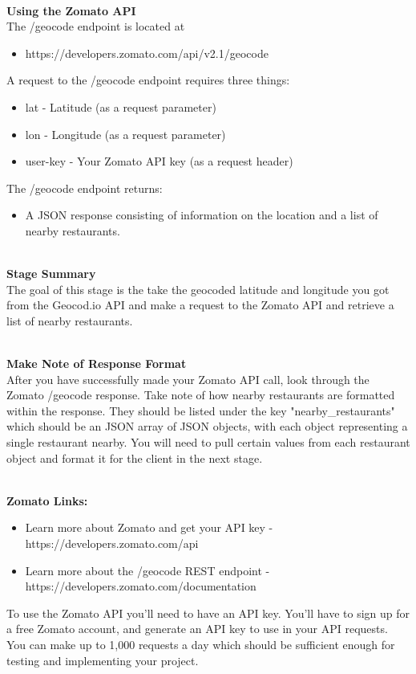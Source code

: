 \documentclass{article}
\newenvironment{info}[1][Info:]{ %
	\medskip
	\begin{mdframed}[style=info]
		\noindent{\textbf{#1}}
}{
	\end{mdframed}
}
\begin{document}
\-\ \\
\textbf{Using the Zomato API} \\
The /geocode endpoint is located at
\begin{itemize}
\item https://developers.zomato.com/api/v2.1/geocode
\end{itemize}
A request to the /geocode endpoint requires three things:
\begin{itemize}
\item lat - Latitude (as a request parameter)
\item lon - Longitude (as a request parameter)
\item user-key - Your Zomato API key (as a request header)
\end{itemize}
The /geocode endpoint returns:
\begin{itemize}
\item A JSON response consisting of information on the location and a list of nearby restaurants.
\end{itemize}

\-\ \\
\textbf{Stage Summary}\\
The goal of this stage is the take the geocoded latitude and longitude you got from the Geocod.io API and make a request to the Zomato API and retrieve a list of nearby restaurants.

\-\ \\
\textbf{Make Note of Response Format}\\
After you have successfully made your Zomato API call, look through the Zomato /geocode response. Take note of how nearby restaurants are formatted within the response. They should be listed under the key "nearby\_restaurants" which should be an JSON array of JSON objects, with each object representing a single restaurant nearby. You will need to pull certain values from each restaurant object and format it for the client in the next stage. 

\-\ \\
\textbf{Zomato Links:}
\begin{itemize}
\item  Learn more about Zomato and get your API key - https://developers.zomato.com/api
\item Learn more about the /geocode REST endpoint - https://developers.zomato.com/documentation
\end{itemize}

\begin{info}[Make sure to get your API key:]
To use the Zomato API you'll need to have an API key. You'll have to sign up for a free Zomato account, and generate an API key to use in your API requests. You can make up to 1,000 requests a day which should be sufficient enough for testing and implementing your project. 
\end{info}
\end{document}

